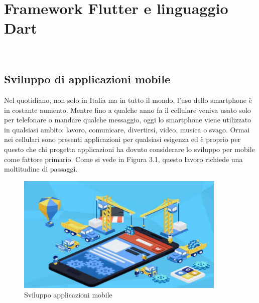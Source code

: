 
\chapter{Framework Flutter e linguaggio Dart}
\label{cap:Framework Flutter e linguaggio Dart}

\\

\section{Sviluppo di applicazioni mobile}
Nel quotidiano, non solo in Italia ma in tutto il mondo, l'uso dello smartphone \cite{statistiche} è in costante aumento.
Mentre fino a qualche anno fa il cellulare veniva usato solo per telefonare o mandare qualche messaggio, oggi lo smartphone viene utilizzato in qualsiasi ambito: lavoro, comunicare, divertirsi, video, musica o svago. 
Ormai nei cellulari sono presenti applicazioni per qualsiasi esigenza ed è proprio per questo che chi progetta applicazioni ha dovuto considerare lo sviluppo per mobile come fattore primario. Come si vede in Figura 3.1, questo lavoro richiede una moltitudine di passaggi.\\
	\begin{figure}[htbp]	
	\centering
	\includegraphics[width=10cm]{immagini/sviluppoapp.png}
	\caption{Sviluppo applicazioni mobile}
	\label{fig:Sviluppo applicazioni mobile}
\end{figure}

